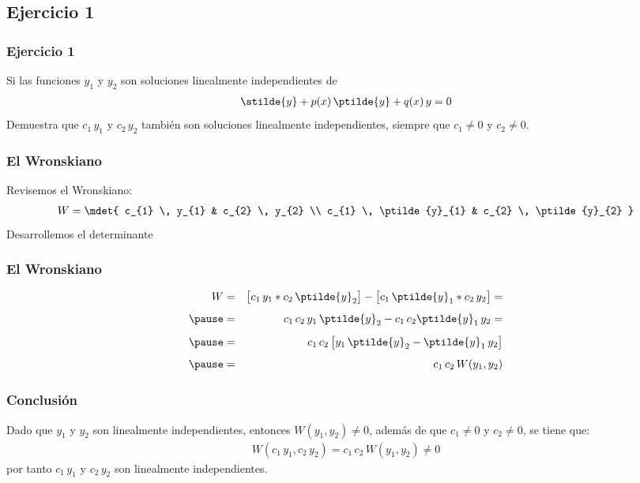 \subsection{Ejercicio 1}
\begin{frame}
\frametitle{Ejercicio 1}
Si las funciones $y_{1}$ y $y_{2}$ son soluciones linealmente independientes de
\begin{align*}
\stilde{y} + p(x) \, \ptilde{y} + q(x) \, y = 0
\end{align*}
Demuestra que $c_{1} \, y_{1}$ y $c_{2} \, y_{2}$ también son soluciones linealmente independientes, siempre que $c_{1} \neq 0$ y $c_{2} \neq 0$.
\end{frame}
\begin{frame}
\frametitle{El Wronskiano}
Revisemos el Wronskiano:
\begin{align*}
W = \mdet{
c_{1} \, y_{1} & c_{2} \, y_{2} \\ 
c_{1} \, \ptilde{y}_{1} & c_{2} \, \ptilde{y}_{2}
}
\end{align*}
Desarrollemos el determinante
\end{frame}
\begin{frame}
\frametitle{El Wronskiano}
\begin{eqnarray*}
W &=& \big[ c_{1} \, y_{1} * c_{2} \, \ptilde{y}_{2} \big] - \big[ c_{1} \, \ptilde{y}_{1} * c_{2} \, y_{2} \big] = \\[0.5em] \pause
&=& c_{1} \, c_{2} \, y_{1} \, \ptilde{y}_{2} - c_{1} \, c_{2} \ptilde{y}_{1} \, y_{2} = \\[0.5em] \pause
&=& c_{1} \, c_{2} \, \big[ y_{1} \, \ptilde{y}_{2} - \ptilde{y}_{1} \, y_{2} \big] \\[0.5em] \pause
&=& c_{1} \, c_{2} \, W(y_{1}, y_{2})
\end{eqnarray*}
\end{frame}
\begin{frame}
\frametitle{Conclusión}
Dado que $y_{1}$ y $y_{2}$ son linealmente independientes, entonces $W(y_{1}, y_{2}) \neq 0$, además de que $c_{1} \neq 0$ y $c_{2} \neq 0$, se tiene que:
\begin{align*}
W(c_{1} \, y_{1}, c_{2} \, y_{2}) = c_{1} \, c_{2} \, W(y_{1}, y_{2}) \neq 0
\end{align*}
por tanto $c_{1} \, y_{1}$ y $c_{2} \, y_{2}$ son linealmente independientes.
\end{frame}
